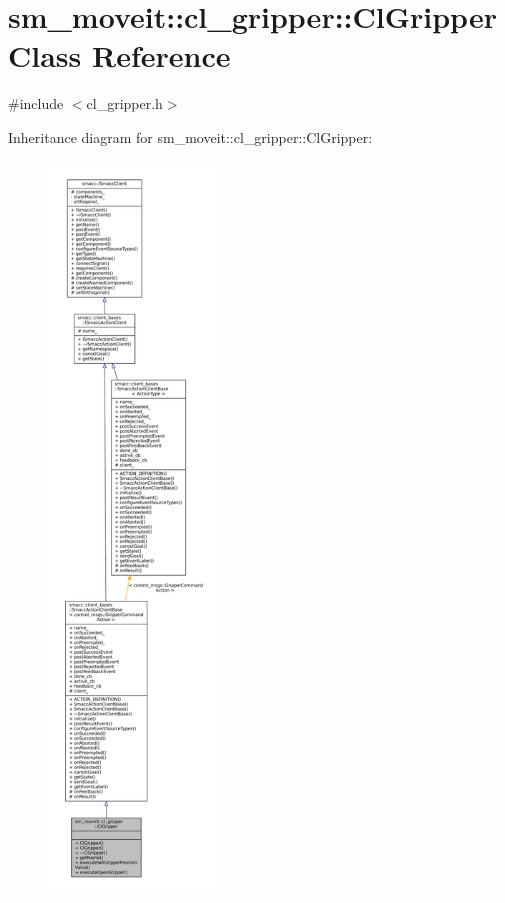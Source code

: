 \hypertarget{classsm__moveit_1_1cl__gripper_1_1ClGripper}{}\section{sm\+\_\+moveit\+:\+:cl\+\_\+gripper\+:\+:Cl\+Gripper Class Reference}
\label{classsm__moveit_1_1cl__gripper_1_1ClGripper}


{\ttfamily \#include $<$cl\+\_\+gripper.\+h$>$}



Inheritance diagram for sm\+\_\+moveit\+:\+:cl\+\_\+gripper\+:\+:Cl\+Gripper\+:
\nopagebreak
\begin{figure}[H]
\begin{center}
\leavevmode
\includegraphics[height=550pt]{classsm__moveit_1_1cl__gripper_1_1ClGripper__inherit__graph}
\end{center}
\end{figure}


